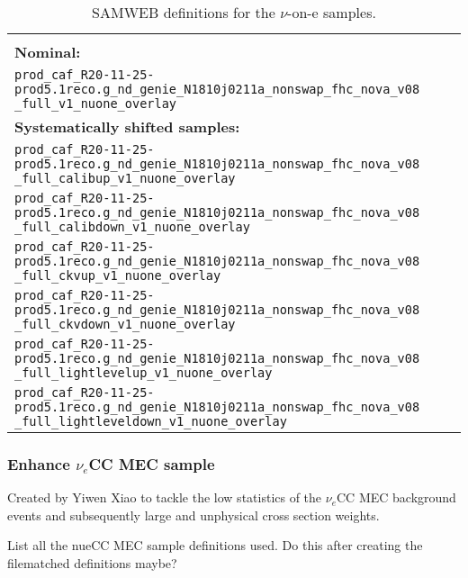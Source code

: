 \begin{table}[!ht]
\centering
\begin{tabular}{p{\textwidth}}
\hline\hline\\
\textbf{Nominal:}\\
\texttt{prod\_caf\_R20-11-25-prod5.1reco.g\_nd\_genie\_N1810j0211a\_nonswap\_fhc\_nova\_v08} \texttt{\_full\_v1\_nuone\_overlay}\\[2mm]
\textbf{Systematically shifted samples:}\\
\texttt{prod\_caf\_R20-11-25-prod5.1reco.g\_nd\_genie\_N1810j0211a\_nonswap\_fhc\_nova\_v08} \texttt{\_full\_calibup\_v1\_nuone\_overlay}\\[2mm]
\texttt{prod\_caf\_R20-11-25-prod5.1reco.g\_nd\_genie\_N1810j0211a\_nonswap\_fhc\_nova\_v08} \texttt{\_full\_calibdown\_v1\_nuone\_overlay}\\[2mm]
\texttt{prod\_caf\_R20-11-25-prod5.1reco.g\_nd\_genie\_N1810j0211a\_nonswap\_fhc\_nova\_v08} \texttt{\_full\_ckvup\_v1\_nuone\_overlay}\\[2mm]
\texttt{prod\_caf\_R20-11-25-prod5.1reco.g\_nd\_genie\_N1810j0211a\_nonswap\_fhc\_nova\_v08} \texttt{\_full\_ckvdown\_v1\_nuone\_overlay}\\[2mm]
\texttt{prod\_caf\_R20-11-25-prod5.1reco.g\_nd\_genie\_N1810j0211a\_nonswap\_fhc\_nova\_v08} \texttt{\_full\_lightlevelup\_v1\_nuone\_overlay}\\[2mm]
\texttt{prod\_caf\_R20-11-25-prod5.1reco.g\_nd\_genie\_N1810j0211a\_nonswap\_fhc\_nova\_v08} \texttt{\_full\_lightleveldown\_v1\_nuone\_overlay}\\[2mm]
\hline\hline
\end{tabular}
\caption{SAMWEB definitions for the $\nu$-on-e samples.}
\label{tab:NuoneDefinitions}
\end{table}

\subsubsection*{Enhance $\nu_e$CC MEC sample}
Created by Yiwen Xiao \cite{NOVA-doc-56383} to tackle the low statistics of the $\nu_e$CC MEC background events and subsequently large and unphysical cross section weights.

List all the nueCC MEC sample definitions used. Do this after creating the filematched definitions maybe?

